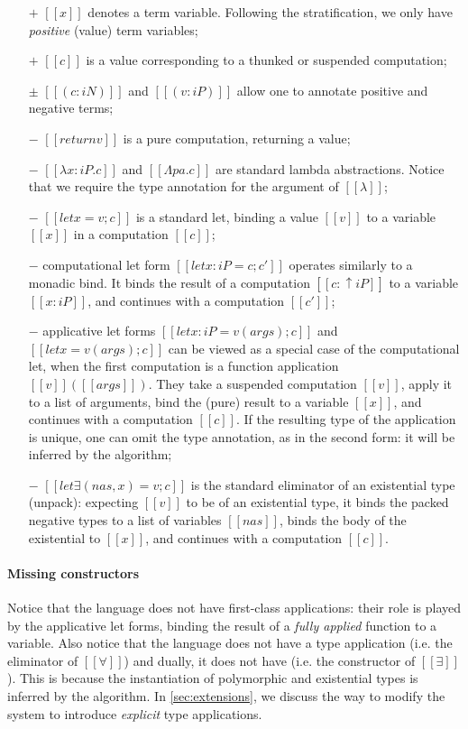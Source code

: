 \begin{itemize}
    \item [$+$] $[[x]]$ denotes a term variable.
      Following the \CBPV stratification, we only have \emph{positive} (value)
      term variables;
    \item [$+$] $[[{c}]]$ is a value corresponding to a thunked 
        or suspended computation;
    \item [$\pm$] $[[(c : iN)]]$ and $[[(v : iP)]]$ allow one to annotate 
        positive and negative terms;
    \item [$-$] $[[return v]]$ is a pure computation, returning a value;
    \item [$-$] $[[λ x : iP . c]]$ and $[[Λ pa . c]]$
        are standard lambda abstractions. Notice that we require
        the type annotation for the argument of $[[λ]]$;
    \item [$-$] $[[ let x = v ; c]]$ is a standard let, binding
        a value $[[v]]$ to a variable $[[x]]$ in a computation $[[c]]$;
    \item [$-$] computational let form $[[ let x : iP = c; c']]$ 
      operates similarly to a monadic bind.
      It binds the result of a computation $[[c : ↑iP]]$ 
      to a variable $[[x : iP]]$, and continues with a computation $[[c']]$;
    \item [$-$] applicative let forms $[[let x : iP = v ( args ) ; c]]$ and
        $[[let x = v ( args ) ; c]]$ can be viewed as a special case of the
        computational let, when the first computation is a function application
        $[[v]] ([[args]])$.
        They take a suspended computation $[[v]]$, apply it to a list of
        arguments, bind the (pure) result to a variable
        $[[x]]$, and continues with a computation $[[c]]$. If the resulting type
        of the application is unique, one can omit the type annotation, as in
        the second form: it will be inferred by the algorithm;
    \item [$-$] $[[let∃ ( nas , x ) = v ; c]]$
        is the standard eliminator of an existential type (unpack):
        expecting $[[v]]$ to be of an existential type,
        it binds the packed negative types to a list of 
        variables $[[nas]]$, binds the body of the existential
        to $[[x]]$, and continues with a computation $[[c]]$.
\end{itemize}

\paragraph{Missing constructors}
Notice that the language does not have first-class applications: 
their role is played by the applicative let forms, binding 
the result of a \emph{fully applied} function to a variable.
Also notice that the language does not have a type application (i.e. the eliminator of $[[∀]]$) and dually, it does not have \pack (i.e. the constructor of $[[∃]]$).
This is because the instantiation of polymorphic and existential types is inferred by the algorithm. 
In \cref{sec:extensions}, we discuss the way to modify the system to introduce \emph{explicit} type applications.



